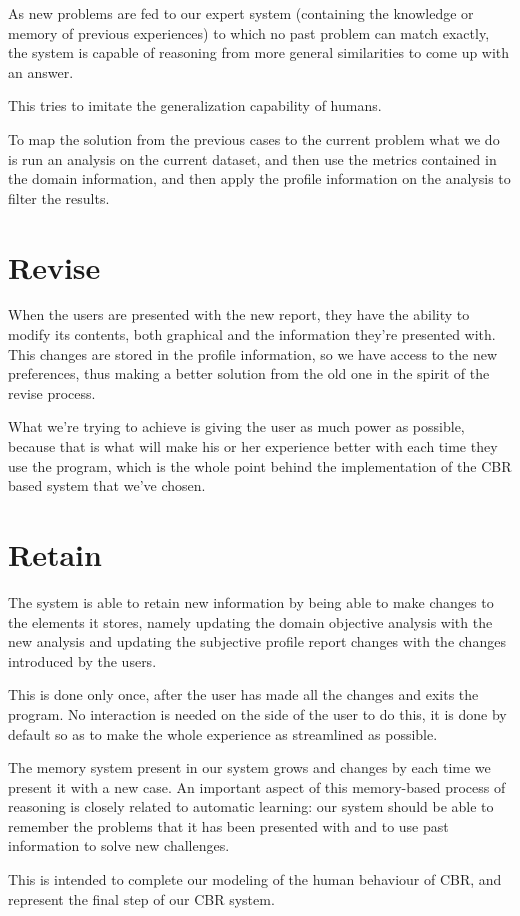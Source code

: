 As new problems are fed to our expert system (containing the knowledge or memory of previous experiences) to which no past problem can match exactly, the system is capable of reasoning from more general similarities to come up with an answer. 

This tries to imitate the generalization capability of humans.

To map the solution from the previous cases to the current problem what we do is run an analysis on the current dataset, and then use the metrics contained in the domain information, and then apply the profile information on the analysis to filter the results.

\section{Revise}
\label{cap5:sec:revise}
When the users are presented with the new report, they have the ability to modify its contents, both graphical and the information they're presented with. This changes are stored in the profile information, so we have access to the new preferences, thus making a better solution from the old one in the spirit of the revise process.

What we're trying to achieve is giving the user as much power as possible, because that is what will make his or her experience better with each time they use the program, which is the whole point behind the implementation of the CBR based system that we've chosen.

\section{Retain}
\label{cap5:sec:retain}
The system is able to retain new information by being able to make changes to the elements it stores, namely updating the domain objective analysis with the new analysis and updating the subjective profile report changes with the changes introduced by the users.

This is done only once, after the user has made all the changes and exits the program. No interaction is needed on the side of the user to do this, it is done by default so as to make the whole experience as streamlined as possible.

The memory system present in our system grows and changes by each time we present it with a new case. An important aspect of this memory-based process of reasoning is closely related to automatic learning: our system should be able to remember the problems that it has been presented with and to use past information to solve new challenges.

This is intended to complete our modeling of the human behaviour of CBR, and represent the final step of our CBR system.

\medskip



